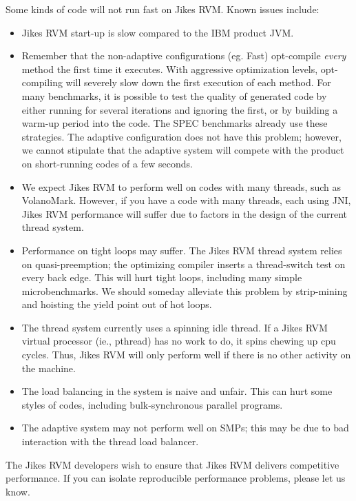 \T \pagebreak[4]
Some kinds of code will not run fast on Jikes RVM.  Known issues include:
\T \nopagebreak
\begin{itemize}
\item Jikes RVM start-up is slow compared to the IBM product JVM.
\item Remember that the non-adaptive configurations (eg. Fast) opt-compile
{\em every} method the first time it executes.  With aggressive optimization
levels, opt-compiling will severely slow down the first execution of
each method.  For many benchmarks, it is possible to test the quality
of generated code by either running for several iterations and ignoring
the first, or by building a warm-up period into the code.  The SPEC benchmarks
already use these strategies.  The adaptive configuration does not
have this problem; however, we cannot stipulate that the adaptive
system will compete with the product on short-running codes of a few seconds.
\item We expect Jikes RVM to perform well on codes with many threads, such as
VolanoMark.  However, if you have a code with many threads, each using
JNI, Jikes RVM performance will suffer due to factors in the design of
the current thread system.
\item Performance on tight loops may suffer.  The Jikes RVM thread system
relies on quasi-preemption; the optimizing compiler inserts a thread-switch
test on every back edge.  This will hurt tight loops, including many
simple microbenchmarks.  We should someday alleviate this problem by
strip-mining and hoisting the yield point out of hot loops.
\item The thread system currently uses a spinning idle thread. If a
Jikes RVM
virtual processor (ie., pthread) has no work to do, it spins chewing up
cpu cycles.  Thus, Jikes RVM will only perform well if there is no other activity on the machine.
\item The load balancing in the system is naive and unfair.  This can hurt some styles of codes, including bulk-synchronous parallel programs.
\item The adaptive system may not perform well on SMPs; this may be due to bad
interaction with the thread load balancer.
\end{itemize}

The Jikes RVM developers wish to ensure that Jikes RVM delivers
competitive performance. 
If you can isolate reproducible performance problems, please let us
know. 

